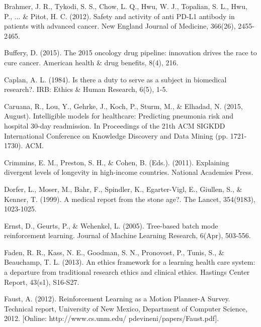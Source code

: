 \documentclass[]{spie}  %
\begin{document}

\noindent[1] Brahmer, J. R., Tykodi, S. S., Chow, L. Q., Hwu, W. J., Topalian, S. L., Hwu, P., ... & Pitot, H. C. (2012). Safety and activity of anti PD-L1 antibody in patients with advanced cancer. New England Journal of Medicine, 366(26), 2455-2465.

\skiplinehalf

\noindent[2] Buffery, D. (2015). The 2015 oncology drug pipeline: innovation drives the race to cure cancer. American health & drug benefits, 8(4), 216.

\skiplinehalf

\noindent [3] Caplan, A. L. (1984). Is there a duty to serve as a subject in biomedical research?. IRB: Ethics & Human Research, 6(5), 1-5.

\skiplinehalf

\noindent [4] Caruana, R., Lou, Y., Gehrke, J., Koch, P., Sturm, M., & Elhadad, N. (2015, August). Intelligible models for healthcare: Predicting pneumonia risk and hospital 30-day readmission. In Proceedings of the 21th ACM SIGKDD International Conference on Knowledge Discovery and Data Mining (pp. 1721-1730). ACM.

\skiplinehalf

\noindent [5] Crimmins, E. M., Preston, S. H., & Cohen, B. (Eds.). (2011). Explaining divergent levels of longevity in high-income countries. National Academies Press.

\skiplinehalf

\noindent [6] Dorfer, L., Moser, M., Bahr, F., Spindler, K., Egarter-Vigl, E., Giullen, S., & Kenner, T. (1999). A medical report from the stone age?. The Lancet, 354(9183), 1023-1025.

\skiplinehalf

\noindent [7] Ernst, D., Geurts, P., & Wehenkel, L. (2005). Tree-based batch mode reinforcement learning. Journal of Machine Learning Research, 6(Apr), 503-556.

\skiplinehalf

\noindent [8] Faden, R. R., Kass, N. E., Goodman, S. N., Pronovost, P., Tunis, S., & Beauchamp, T. L. (2013). An ethics framework for a learning health care system: a departure from traditional research ethics and clinical ethics. Hastings Center Report, 43(s1), S16-S27.

\skiplinehalf

\noindent [9] Faust, A. (2012). Reinforcement Learning as a Motion Planner-A Survey. Technical report, University of New Mexico, Department of Computer Science, 2012. [Online: http://www.cs.unm.edu/ pdevineni/papers/Faust.pdf].
\end{document}
